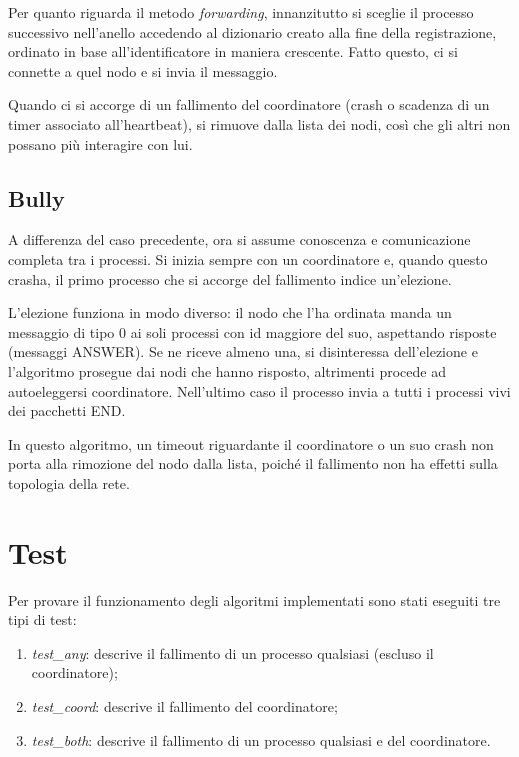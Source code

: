 \documentclass[conference]{IEEEtran}
\begin{document}
Per quanto riguarda il metodo \textit{forwarding}, innanzitutto si sceglie il processo successivo nell'anello accedendo al dizionario creato alla fine della registrazione, ordinato in base all'identificatore in maniera crescente.
Fatto questo, ci si connette a quel nodo e si invia il messaggio.

Quando ci si accorge di un fallimento del coordinatore (crash o scadenza di un timer associato all'heartbeat), si rimuove dalla lista dei nodi, così che gli altri non possano più interagire con lui.


\subsection{Bully}\label{bully}

A differenza del caso precedente, ora si assume conoscenza e comunicazione completa tra i processi.
Si inizia sempre con un coordinatore e, quando questo crasha, il primo processo che si accorge del fallimento indice un'elezione.

L'elezione funziona in modo diverso: il nodo che l'ha ordinata manda un messaggio di tipo 0 ai soli processi con id maggiore del suo, aspettando risposte (messaggi ANSWER).
Se ne riceve almeno una, si disinteressa dell'elezione e l'algoritmo prosegue dai nodi che hanno risposto, altrimenti procede ad autoeleggersi coordinatore.
Nell'ultimo caso il processo invia a tutti i processi vivi dei pacchetti END.

In questo algoritmo, un timeout riguardante il coordinatore o un suo crash non porta alla rimozione del nodo dalla lista, poiché il fallimento non ha effetti sulla topologia della rete.


\section{Test}\label{sec:tests}

Per provare il funzionamento degli algoritmi implementati sono stati eseguiti tre tipi di test:

\begin{enumerate}
    \item \textit{test\_any}: descrive il fallimento di un processo qualsiasi (escluso il coordinatore);
    \item \textit{test\_coord}: descrive il fallimento del coordinatore;
    \item \textit{test\_both}: descrive il fallimento di un processo qualsiasi e del coordinatore.
\end{enumerate}
\end{document}
